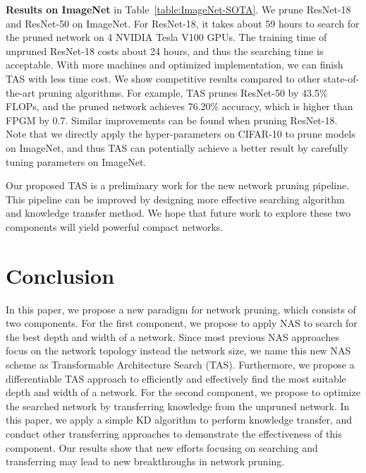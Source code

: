 \documentclass{article}
\def\Tabref#1{Table~\ref{#1}}
\def\NAME{{TAS}}
\begin{document}
\textbf{Results on ImageNet} in \Tabref{table:ImageNet-SOTA}.
We prune ResNet-18 and ResNet-50 on ImageNet.
For ResNet-18, it takes about 59 hours to search for the pruned network on 4 NVIDIA Tesla V100 GPUs.
The training time of unpruned ResNet-18 costs about 24 hours, and thus the searching time is acceptable.
With more machines and optimized implementation, we can finish {\NAME} with less time cost.
We show competitive results compared to other state-of-the-art pruning algorithms.
For example, {\NAME} prunes ResNet-50 by 43.5\% FLOPs, and the pruned network achieves 76.20\% accuracy, which is higher than FPGM by 0.7.
Similar improvements can be found when pruning ResNet-18.
Note that we directly apply the hyper-parameters on CIFAR-10 to prune models on ImageNet, and thus {\NAME} can potentially achieve a better result by carefully tuning parameters on ImageNet.

Our proposed {\NAME} is a preliminary work for the new network pruning pipeline. This pipeline can be improved by designing more effective searching algorithm and knowledge transfer method.
We hope that future work to explore these two components will yield powerful compact networks.




\section{Conclusion}\label{sec:conclusion}

In this paper, we propose a new paradigm for network pruning, which consists of two components.
For the first component, we propose to apply NAS to search for the best depth and width of a network. Since most previous NAS approaches focus on the network topology instead the network size, we name this new NAS scheme as Transformable Architecture Search (TAS).
Furthermore, we propose a differentiable TAS approach to efficiently and effectively find the most suitable depth and width of a network. For the second component, we propose to optimize the searched network by transferring knowledge from the unpruned network.
In this paper, we apply a simple KD algorithm to perform knowledge transfer, and conduct other transferring approaches to demonstrate the effectiveness of this component.
Our results show that new efforts focusing on searching and transferring may lead to new breakthroughs in network pruning.


{\small

}
\end{document}
